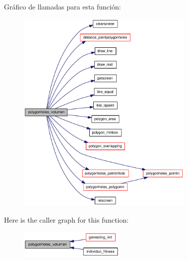 Gr\'{a}fico de llamadas para esta funci\'{o}n:\begin{figure}[H]
\begin{center}
\leavevmode
\includegraphics[width=242pt]{group__geometry_g7cf8b3f8c76179bb936754bbbf510999_g7cf8b3f8c76179bb936754bbbf510999_cgraph}
\end{center}
\end{figure}


Here is the caller graph for this function:\begin{figure}[H]
\begin{center}
\leavevmode
\includegraphics[width=144pt]{group__geometry_g7cf8b3f8c76179bb936754bbbf510999_g7cf8b3f8c76179bb936754bbbf510999_icgraph}
\end{center}
\end{figure}
